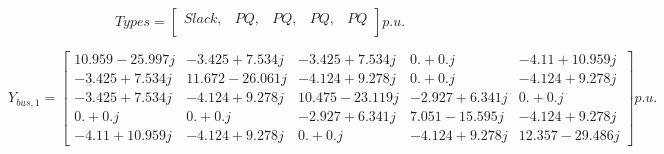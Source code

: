 \documentclass[nols,a4paper,twoside,symmetric,notoc,fleqn]{tufte-book}
\begin{document}
$$
Types = \left[ \begin{array}{ccccc}
Slack, & PQ,  & PQ, & PQ,  & PQ \\
\end{array} \right] p.u.
$$


$$
Y_{bus,1} = \left[ \begin{array}{ccccc}
10.959-25.997j & -3.425 +7.534j & -3.425 +7.534j &  0.    +0.   j & -4.11 +10.959j\\
-3.425 +7.534j & 11.672-26.061j & -4.124 +9.278j &  0.    +0.   j & -4.124 +9.278j\\
-3.425 +7.534j & -4.124 +9.278j & 10.475-23.119j & -2.927 +6.341j &  0.    +0.   j\\
 0.    +0.   j &  0.    +0.   j & -2.927 +6.341j &  7.051-15.595j & -4.124 +9.278j\\
-4.11 +10.959j & -4.124 +9.278j &  0.    +0.   j & -4.124 +9.278j & 12.357-29.486j

\end{array} \right] p.u.
$$



\backmatter





\printindex
\end{document}
